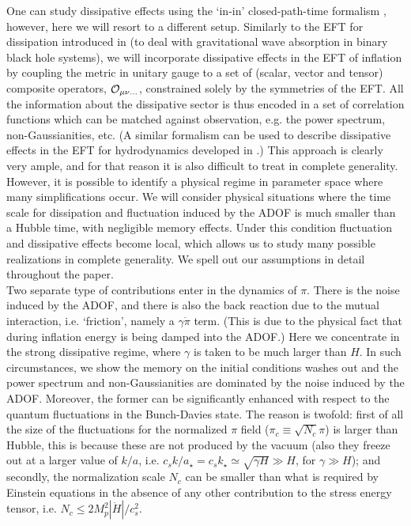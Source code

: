 \documentclass[11pt,amsmath,floats,floatfix,nofootinbib,secnumarabic, superscriptaddress, tightenlines]{revtex4}
\begin{document}
One can study dissipative effects using the `in-in' closed-path-time formalism \cite{calzetta}, however, here we will resort to a different setup. Similarly to the EFT for dissipation introduced in \cite{dis1,dis2} (to deal with gravitational wave absorption in binary black hole systems), we will incorporate dissipative effects in the EFT of inflation by coupling the metric in unitary gauge to a set of (scalar, vector and tensor) composite operators, $\cal O_{\mu\nu\ldots}$, constrained solely by the symmetries of the EFT. All the information about the dissipative sector is thus encoded in a set of correlation functions which can be matched against observation, e.g. the power spectrum, non-Gaussianities, etc. (A similar formalism  \cite{hydro} can be used to describe dissipative effects in the EFT for hydrodynamics developed in \cite{efthydro}.)
This approach is clearly very ample, and for that reason it is also difficult to treat in complete generality. However, it is possible to identify a physical regime in parameter space where many simplifications occur. We will consider physical situations where the time scale for dissipation and fluctuation induced by the ADOF is much smaller than a Hubble time, with negligible memory effects. Under this condition fluctuation and dissipative effects become local, which allows us to study many possible realizations in complete generality. We spell out our assumptions in detail throughout the paper.\\

Two separate type of contributions enter in the dynamics of $\pi$. There is the noise induced by the ADOF, and there is also the back reaction due to the mutual interaction, i.e. `friction', namely a $\gamma\dot\pi$ term. (This is due to the physical fact that during inflation energy is being damped into the ADOF.) 
Here we concentrate in the strong dissipative regime, where $\gamma$ is taken to be much larger than $H$. In such circumstances, we show the memory on the initial conditions washes out and the power spectrum and non-Gaussianities are dominated by the noise induced by the ADOF. Moreover, the former can be significantly enhanced with respect to the quantum fluctuations in the Bunch-Davies state. The reason is twofold: first of all the size of the fluctuations for the normalized $\pi$ field ($\pi_c \equiv \sqrt{N_c}\pi$) is larger than Hubble, this is because these are not produced by the vacuum (also they freeze out at a larger value of $k/a$, i.e. $c_s k/a_\star = c_s k_\star \simeq \sqrt{\gamma H} \gg H$, for $\gamma \gg H$); and secondly, the normalization scale $N_c$ can be smaller than what is required by Einstein equations in the absence of any other contribution to the stress energy tensor, i.e. $N_c \leq 2 M_p^2|\dot H|/c_s^2$.\\
\end{document}
